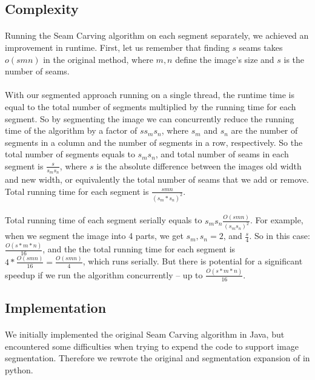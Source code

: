 \documentclass[conference]{acmsiggraph}
\begin{document}
\subsection{Complexity}

\paragraph{}
Running the Seam Carving algorithm on each segment separately, we achieved an improvement in runtime. First, let us remember that finding $s$ seams takes $o(s m n)$ in the original method, where $m,n$ define the image's size and $s$ is the number of seams.

\paragraph{}
With our segmented approach running on a single thread, the runtime time is equal to the total number of segments multiplied by the running time for each segment. So by segmenting the image we can concurrently reduce the running time of the algorithm by a factor of $s s_m s_n$, where $s_m$ and $s_n$ are the number of segments in a column and the number of segments in a row, respectively. So the total number of segments equals to $s_m s_n$, and total number of seams in each segment is $\frac{s}{s_m s_n} $, where $s$ is the absolute difference between the images old width and new width, or equivalently the total number of seams that we add or remove. Total running time for each segment is $ \frac{s m n}{(s_m*s_n)^2} $.


\paragraph{}
Total running time of each segment serially equals to $ s_m s_n   \frac{ O( s m n ) }{ ( s_m s_n)^2  }$. For example, when we segment the image into 4 parts, we get $s_m,s_n=2$, and $\frac{s}{4}$. So in this case: $\frac{O(s*m*n)}{16}$, and the the total running time for each segment is $4 * \frac{O (s m n)}{16} = \frac{O(s m n)}{4}$, which runs serially. But there is potential for a significant speedup if we run the algorithm concurrently -- up to $\frac{O(s*m*n)}{16}$.



\subsection{Implementation}

\paragraph{}
We initially implemented the original Seam Carving algorithm in Java, but encountered some difficulties when trying to expend the code to support image segmentation. Therefore we rewrote the original and segmentation expansion of in python. 
\end{document}
